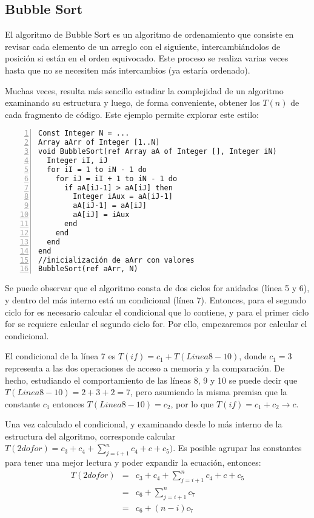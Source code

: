 \subsection{Bubble Sort}

El algoritmo de Bubble Sort es un algoritmo de ordenamiento que consiste en revisar cada elemento de un arreglo con el siguiente, intercambiándolos de posición si están en el orden equivocado. Este proceso se realiza varias veces hasta que no se necesiten más intercambios (ya estaría ordenado).

Muchas veces, resulta más sencillo estudiar la complejidad de un algoritmo examinando su estructura y luego, de forma conveniente, obtener los $T(n)$ de cada fragmento de código. Este ejemplo permite explorar este estilo:

\begin{lstlisting}[upquote=true, language=pseudo, numbers=left]
Const Integer N = ... 
Array aArr of Integer [1..N]
void BubbleSort(ref Array aA of Integer [], Integer iN)
  Integer iI, iJ
  for iI = 1 to iN - 1 do
    for iJ = iI + 1 to iN - 1 do
      if aA[iJ-1] > aA[iJ] then
        Integer iAux = aA[iJ-1]
        aA[iJ-1] = aA[iJ]
        aA[iJ] = iAux
      end
    end
  end
end
//inicialización de aArr con valores
BubbleSort(ref aArr, N)
\end{lstlisting}

Se puede observar que el algoritmo consta de dos ciclos for anidados (línea 5 y 6), y dentro del más interno está un condicional (línea 7). Entonces, para el segundo ciclo for es necesario calcular el condicional que lo contiene, y para el primer ciclo for se requiere calcular el segundo ciclo for. Por ello, empezaremos por calcular el condicional.

El condicional de la línea 7 es $T(if) = c_1 + T(Linea8-10)$, donde $c_1 = 3$ representa a las dos operaciones de acceso a memoria y la comparación. De hecho, estudiando el comportamiento de las líneas 8, 9 y 10 se puede decir que $T(Linea8-10) = 2 + 3 + 2 = 7$, pero asumiendo la misma premisa que la constante $c_1$ entonces $T(Linea8-10) = c_2$, por lo que $T(if) = c_1 + c_2 \rightarrow c$.

Una vez calculado el condicional, y examinando desde lo más interno de la estructura del algoritmo, corresponde calcular $T(2dofor) = c_3 + c_4 + \sum_{j=i+1}^{n}{c_4 + c + c_5)}$. Es posible agrupar las constantes para tener una mejor lectura y poder expandir la ecuación, entonces:
\begin{eqnarray*}
T(2dofor)&=&c_3 + c_4 + \sum_{j=i+1}^{n}{c_4 + c + c_5}\\
&=&c_6 + \sum_{j=i+1}^{n}{c_7}\\
&=&c_6 + (n-i){c_7}
\end{eqnarray*}

